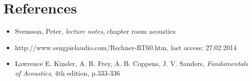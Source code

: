 \documentclass{article}
\begin{document}
\section{References}
\footnotesize{
\begin{itemize}
\item Svensson, Peter, \textit{lecture notes}, chapter room acoustics
\item http://www.sengpielaudio.com/Rechner-RT60.htm, last access: 27.02.2014
\item Lawrence E. Kinsler, A. R. Frey, A. B. Coppens, J. V. Sanders, \textit{Fundamentals of Acoustics}, 4th edition, p.333-336
\end{itemize}
}
\end{document}
